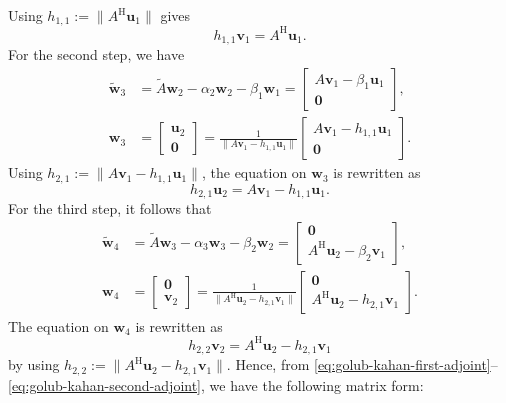 {Using $h_{1,1}:=\|A^{\mathrm H}\bm u_1\|$ gives}
\begin{equation}\label{eq:golub-kahan-first-adjoint}h_{1,1}\bm v_1=A^{\mathrm H}\bm u_1.\end{equation}
{For the second step, we have}
\[\begin{aligned}\widetilde{\bm w}_3&=\widetilde A\bm w_2-\alpha_2\bm w_2-\beta_1\bm w_1=\begin{bmatrix}A\bm v_1-\beta_1\bm u_1\\\bm0\end{bmatrix},\\
\bm w_3&=\begin{bmatrix}\bm u_2\\\bm0\end{bmatrix}=\frac1{\|A\bm v_1-h_{1,1}\bm u_1\|}\begin{bmatrix}A\bm v_1-h_{1,1}\bm u_1\\\bm0\end{bmatrix}.\end{aligned}\]
{Using $h_{2,1}:=\|A\bm v_1-h_{1,1}\bm u_1\|$, the equation on $\bm w_3$ is rewritten as}
\begin{equation}\label{eq:golub-kahan-first-forward}h_{2,1}\bm u_2=A\bm v_1-h_{1,1}\bm u_1.\end{equation}
{For the third step, it follows that}
\[\begin{aligned}\widetilde{\bm w}_4&=\widetilde A\bm w_3-\alpha_3\bm w_3-\beta_2\bm w_2=\begin{bmatrix}\bm0\\A^{\mathrm H}\bm u_2-\beta_2\bm v_1\end{bmatrix},\\
\bm w_4&=\begin{bmatrix}\bm0\\\bm v_2\end{bmatrix}=\frac1{\|A^{\mathrm H}\bm u_2-h_{2,1}\bm v_1\|}\begin{bmatrix}\bm0\\A^{\mathrm H}\bm u_2-h_{2,1}\bm v_1\end{bmatrix}.\end{aligned}\]
{The equation on $\bm w_4$ is rewritten as}
\begin{equation}\label{eq:golub-kahan-second-adjoint}h_{2,2}\bm v_2=A^{\mathrm H}\bm u_2-h_{2,1}\bm v_1\end{equation}
{by using $h_{2,2}:=\|A^{\mathrm H}\bm u_2-h_{2,1}\bm v_1\|$. Hence, from \eqref{eq:golub-kahan-first-adjoint}--\eqref{eq:golub-kahan-second-adjoint}, we have the following matrix form:}
